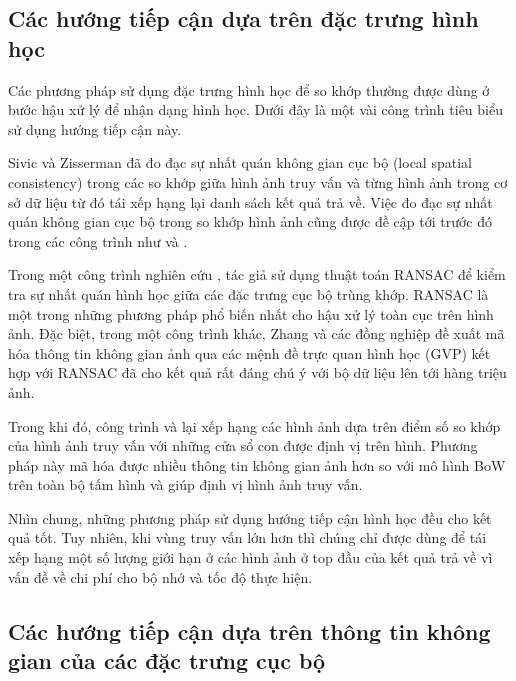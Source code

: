 \subsection{Các hướng tiếp cận dựa trên đặc trưng hình học}
\label{geometry}
Các phương pháp sử dụng đặc trưng hình học để so khớp thường được dùng ở bước hậu xử lý để nhận dạng hình học. Dưới đây là một vài công trình tiêu biểu sử dụng hướng tiếp cận này.

Sivic và Zisserman \cite{sivic2003video} đã đo đạc sự nhất quán không gian cục bộ (local spatial consistency) trong các so khớp giữa hình ảnh truy vấn và từng hình ảnh trong cơ sở dữ liệu từ đó tái xếp hạng lại danh sách kết quả trả về. Việc đo đạc sự nhất quán không gian cục bộ trong so khớp hình ảnh cũng được đề cập tới trước đó trong các công trình như \cite{zhang1995robust} và \cite{schmid1997local}.

Trong một công trình nghiên cứu \cite{philbin2007object}, tác giả sử dụng thuật toán RANSAC \cite{fischler1981random} để kiểm tra sự nhất quán hình học giữa các đặc trưng cục bộ trùng khớp. RANSAC là một trong những phương pháp phổ biến nhất cho hậu xử lý toàn cục trên hình ảnh. Đặc biệt, trong một công trình khác, Zhang và các đồng nghiệp \cite{zhang2011image} đề xuất mã hóa thông tin không gian ảnh qua các mệnh đề trực quan hình học (GVP) kết hợp với RANSAC đã cho kết quả rất đáng chú ý với bộ dữ liệu lên tới hàng triệu ảnh.

Trong khi đó, công trình \cite{lin2010local} và \cite{lampert2009detecting} lại xếp hạng các hình ảnh dựa trên điểm số so khớp của hình ảnh truy vấn với những cửa sổ con được định vị trên hình. Phương pháp này mã hóa được nhiều thông tin không gian ảnh hơn so với mô hình BoW trên toàn bộ tấm hình và giúp định vị hình ảnh truy vấn.

Nhìn chung, những phương pháp sử dụng hướng tiếp cận hình học đều cho kết quả tốt. Tuy nhiên, khi vùng truy vấn lớn hơn thì chúng chỉ được dùng để tái xếp hạng một số lượng giới hạn ở các hình ảnh ở top đầu của kết quả trả về vì vấn đề về chi phí cho bộ nhớ và tốc độ thực hiện.

\subsection{Các hướng tiếp cận dựa trên thông tin không gian của các đặc trưng cục bộ}
\label{spm}

